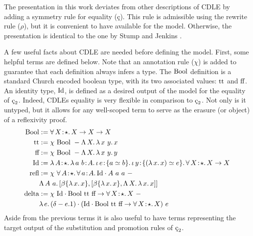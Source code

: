 The presentation in this work deviates from other descriptions of CDLE by adding a symmetry rule for equality (\c{c}).
This rule is admissible using the rewrite rule ($\rho$), but it is convenient to have available for the model.
Otherwise, the presentation is identical to the one by Stump and Jenkins \cite{stump2021_cedillecore}.




A few useful facts about CDLE are needed before defining the model.
First, some helpful terms are defined below.
Note that an annotation rule ($\chi$) is added to guarantee that each definition always infers a type.
The $\textnormal{Bool}$ definition is a standard Church encoded boolean type, with its two associated values: $\textnormal{tt}$ and $\textnormal{ff}$.
An identity type, $\textnormal{Id}$, is defined as a desired output of the model for the equality of $\ced$.
Indeed, CDLEs equality is very flexible in comparison to $\ced$.
Not only is it untyped, but it allows for any well-scoped term to serve as the erasure (or object) of a reflexivity proof.
\begin{align*}
    \cBool &:= \abs{\forall}{X}{\star}{X \to X \to X} \\
    \ctt &:= \chi\ \cBool\ - \absu{\Lambda}{X}{
        \absu{\lambda}{x\ y}{x}
    } \\
    \cff &:= \chi\ \cBool\ - \absu{\Lambda}{X}{
        \absu{\lambda}{x\ y}{y}
    } \\
    \cId &:= \abs{\lambda}{A}{\star}{
        \abs{\lambda}{a\ b}{A}{
            \abs{\iota}{e}{\{ a \simeq b \}}{
                \abs{\iota}{y}{\{ (\absu{\lambda}{x}{x}) \simeq e \}}{
                    \abs{\forall}{X}{\star}{
                        X \to X
                    }
                }
            }
        }
    } \\
    \crefl &:= \chi\ \abs{\forall}{A}{\star}{
            \abs{\forall}{a}{A}{
                \cId \cdot A\ a\ a
            }
        }\ -
        \\ &\absu{\Lambda}{A\ a}{
        [\beta\{ \absu{\lambda}{x}{x} \}, [\beta\{ \absu{\lambda}{x}{x} \}, \absu{\Lambda}{X}{\absu{\lambda}{x}{x}}]]
    } \\
    \cdelta &:= \chi\ \cId \cdot \cBool\ \ctt\ \cff \to \abs{\forall}{X}{\star}{X}\ -
        \\ &\absu{\lambda}{e}{
        (\delta - e.1) \cdot (\cId \cdot \cBool\ \ctt\ \cff \to \abs{\forall}{X}{\star}{X})\ e
    }
\end{align*}
Aside from the previous terms it is also useful to have terms representing the target output of the substitution and promotion rules of $\ced$.
